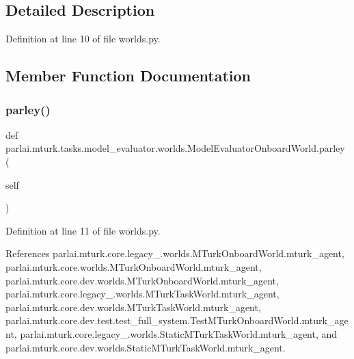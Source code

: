 \subsection{Detailed Description}


Definition at line 10 of file worlds.\+py.



\subsection{Member Function Documentation}
\mbox{\label{classparlai_1_1mturk_1_1tasks_1_1model__evaluator_1_1worlds_1_1ModelEvaluatorOnboardWorld_a1ac5cd28dd7c3733b9f0ee491f476363}} 
\subsubsection{\texorpdfstring{parley()}{parley()}}
{\footnotesize\ttfamily def parlai.\+mturk.\+tasks.\+model\+\_\+evaluator.\+worlds.\+Model\+Evaluator\+Onboard\+World.\+parley (\begin{DoxyParamCaption}\item[{}]{self }\end{DoxyParamCaption})}



Definition at line 11 of file worlds.\+py.



References parlai.\+mturk.\+core.\+legacy\+\_.\+worlds.\+M\+Turk\+Onboard\+World.\+mturk\+\_\+agent, parlai.\+mturk.\+core.\+worlds.\+M\+Turk\+Onboard\+World.\+mturk\+\_\+agent, parlai.\+mturk.\+core.\+dev.\+worlds.\+M\+Turk\+Onboard\+World.\+mturk\+\_\+agent, parlai.\+mturk.\+core.\+legacy\+\_.\+worlds.\+M\+Turk\+Task\+World.\+mturk\+\_\+agent, parlai.\+mturk.\+core.\+dev.\+worlds.\+M\+Turk\+Task\+World.\+mturk\+\_\+agent, parlai.\+mturk.\+core.\+dev.\+test.\+test\+\_\+full\+\_\+system.\+Test\+M\+Turk\+Onboard\+World.\+mturk\+\_\+agent, parlai.\+mturk.\+core.\+legacy\+\_.\+worlds.\+Static\+M\+Turk\+Task\+World.\+mturk\+\_\+agent, and parlai.\+mturk.\+core.\+dev.\+worlds.\+Static\+M\+Turk\+Task\+World.\+mturk\+\_\+agent.



